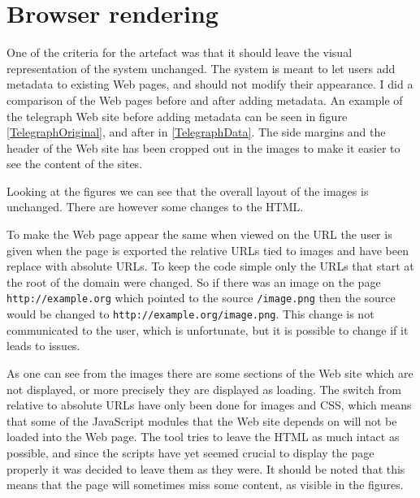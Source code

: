\section{Browser rendering}
\label{Rendering}
One of the criteria for the artefact was that it should leave the visual representation of the system unchanged.
The system is meant to let users add metadata to existing Web pages, and should not modify their appearance.
I did a comparison of the Web pages before and after adding metadata.
An example of the telegraph Web site before adding metadata can be seen in figure \ref{TelegraphOriginal},
and after in \ref{TelegraphData}.
The side margins and the header of the Web site has been cropped out in the images to make it easier to see the content of the sites.


Looking at the figures we can see that the overall layout of the images is unchanged.
There are however some changes to the HTML.

To make the Web page appear the same when viewed on the URL the user is given when the page is exported
the relative URLs tied to images and  have been replace with absolute URLs.
To keep the code simple only the URLs that start at the root of the domain were changed.
So if there was an image on the page \texttt{http://example.org} which pointed to the source \texttt{/image.png}
then the source would be changed to \texttt{http://example.org/image.png}.
This change is not communicated to the user, which is unfortunate,
but it is possible to change if it leads to issues.

As one can see from the images there are some sections of the Web site which are not displayed, or more precisely they
are displayed as loading.
The switch from relative to absolute URLs have only been done for images and CSS,
which means that some of the JavaScript modules that the Web site depends on will not be loaded into the Web page.
The tool tries to leave the HTML as much intact as possible,
and since the scripts have yet seemed crucial to display the page properly it was decided to leave them as they were.
It should be noted that this means that the page will sometimes miss some content, as visible in the figures.

